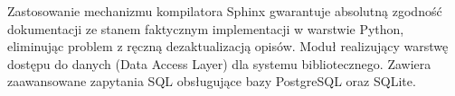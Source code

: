 \documentclass[a4paper,11pt,english,openany,oneside]{sphinxmanual}
\begin{document}
\sphinxAtStartPar
Zastosowanie mechanizmu kompilatora Sphinx gwarantuje absolutną zgodność dokumentacji ze stanem faktycznym implementacji w warstwie Python, eliminując problem z ręczną dezaktualizacją opisów.
\label{\detokenize{rozdzial_5/index:module-biblioteka_zapytania}}
\sphinxAtStartPar
Moduł realizujący warstwę dostępu do danych (Data Access Layer) dla systemu bibliotecznego.
Zawiera zaawansowane zapytania SQL obsługujące bazy PostgreSQL oraz SQLite.
\end{document}
